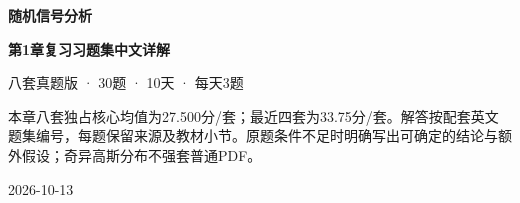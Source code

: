 \documentclass[10.5pt,fontset=fandol]{ctexart}
\begin{document}
\begin{titlepage}\centering\vspace*{1.5cm}
{\Huge\bfseries 随机信号分析}\par\vspace{1cm}
{\LARGE\bfseries 第1章复习习题集中文详解}\par\vspace{1cm}
{\large 八套真题版 · 30题 · 10天 · 每天3题}\par\vspace{1cm}
\begin{tcolorbox}[colback=qbg,colframe=navy]
本章八套独占核心均值为27.500分/套；最近四套为33.75分/套。解答按配套英文题集编号，每题保留来源及教材小节。原题条件不足时明确写出可确定的结论与额外假设；奇异高斯分布不强套普通PDF。
\end{tcolorbox}\vfill 2026-10-13\end{titlepage}
\end{document}
